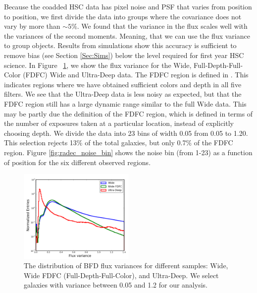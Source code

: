 \documentclass[useAMS,usenatbib]{mnras}
\begin{document}
Because the coadded HSC data has pixel noise and PSF that varies from position to position, we first divide the data into groups where the covariance does not vary by more than $\sim5\%$.    We found that the variance in the flux scales well with the variances of the second moments.  Meaning, that we can use the flux variance to group objects.  Results from simulations show this accuracy is sufficient to remove bias (see Section \ref{Sec:Sims}) below the level required for first year HSC science. In Figure ~\ref{fig:flux_var}, we show the flux variance for the Wide, Full-Depth-Full-Color (FDFC) Wide and Ultra-Deep data.  The FDFC region is defined in \cite{ShearPaper:inprep}.  This indicates regions where we have obtained sufficient colors and depth in all five filters.   We see that the Ultra-Deep data is less noisy as expected, but that the FDFC region still has a large dynamic range similar to the full Wide data.  This may be partly due the definition of the FDFC region, which is defined in terms of the number of exposures taken at a particular location, instead of explicitly choosing depth.  We divide the data into 23 bins of width 0.05 from 0.05 to 1.20.  This selection rejects 13$\%$ of the total galaxies, but only 0.7$\%$ of the FDFC region. Figure \ref{fig:radec_noise_bin} shows the noise bin (from 1-23) as a function of position for the six different observed regions.

\begin{figure}
    \includegraphics[width=0.5\textwidth]{flux_var.png}
    \caption{
       The distribution of BFD flux variances for different samples: Wide, Wide FDFC (Full-Depth-Full-Color), and Ultra-Deep.  We select galaxies with variance between 0.05 and 1.2 for our analysis.
    }
    \label{fig:flux_var}
\end{figure}
\end{document}
